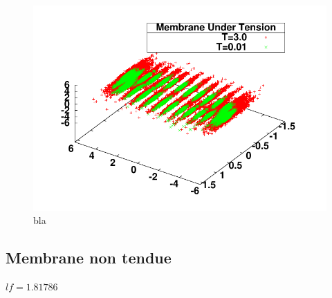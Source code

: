 \begin{figure}[H]
\begin{center}
\begin{minipage}{0.29\linewidth}
\end{minipage}
\includegraphics[width=\textwidth]{3dhighmembranetension.pdf}  
\caption[Membrane tendue]{bla}

\label{membranetendue}
\end{center}
\end{figure}



\subsection{Membrane non tendue}

$lf=1.81786$


